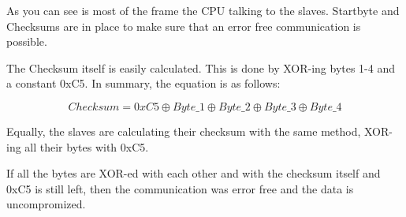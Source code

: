 As you can see is most of the frame the CPU talking to the slaves. Startbyte and Checksums are in place to make sure that an error free communication is possible. 

The Checksum itself is easily calculated. This is done by XOR-ing bytes 1-4 and a constant 0xC5. In summary, the equation is as follows:

\begin{equation}
    Checksum = 0xC5 \oplus Byte\_1 \oplus Byte\_2 \oplus Byte\_3 \oplus Byte\_4
\end{equation}

Equally, the slaves are calculating their checksum with the same method, XOR-ing all their bytes with 0xC5. 

If all the bytes are XOR-ed with each other and with the checksum itself and 0xC5 is still left, then the communication was error free and the data is uncompromized.